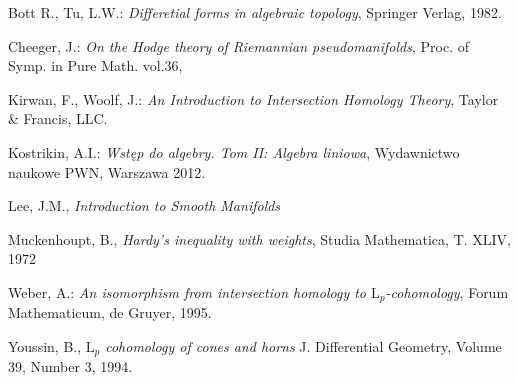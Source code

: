 \documentclass[licencjacka]{pracamgr}
\theoremstyle{definition}
\theoremstyle{definition}
\theoremstyle{plain}
\theoremstyle{plain}
\theoremstyle{plain}
\theoremstyle{plain}
\begin{document}
\begin{thebibliography}{99}

 Bott R., Tu, L.W.: \textit{Differetial forms in algebraic
  topology}, Springer Verlag, 1982.

  
 Cheeger, J.: \textit{On the Hodge theory
  of Riemannian pseudomanifolds}, Proc. of Symp. in Pure Math. vol.36,

  Kirwan, F., Woolf, J.: \textit{An Introduction
to Intersection Homology Theory}, Taylor \& Francis, LLC.

 Kostrikin, A.I.: \textit{Wstęp do algebry.
Tom II: Algebra liniowa}, Wydawnictwo naukowe PWN, Warszawa 2012.

 Lee, J.M., \textit{Introduction to Smooth Manifolds}

 Muckenhoupt, B., \textit{Hardy's inequality
with weights}, Studia Mathematica, T. XLIV, 1972

  Weber, A.: \textit{An isomorphism from
  intersection homology to $\mathrm{L}_p$-cohomology}, Forum
  Mathematicum, de Gruyer, 1995.

 Youssin, B., \textit{$\mathrm{L}_p$
  cohomology of cones and horns } J. Differential Geometry, Volume 39,
  Number 3, 1994.

\end{thebibliography}
\end{document}
